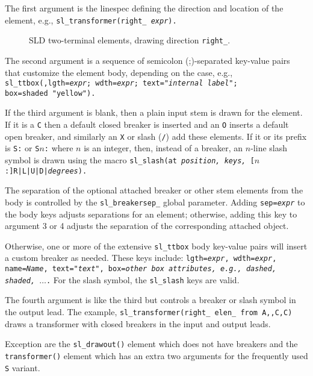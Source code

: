 The first argument is the linespec defining the direction and location
of the element, e.g.,
{\tt sl\_transformer(right\_ {\sl expr}).}
\begin{figure}[H]
   \SLDTwoTerms
   \caption{SLD two-terminal elements, drawing direction {\tt right\_}.}
   \label{SLDTwoTerms}
   \end{figure}

The second argument is a sequence of semicolon (;)-separated key-value
pairs that customize the element body, depending on the case, e.g.,
{\tt sl\_ttbox(,lgth={\sl expr}; wdth={\sl expr};
 text="{\sl internal label}"; box=shaded~"yellow").}

If the third argument is blank, then a plain input stem is drawn for the
element.
If it is a {\tt C} then a default closed
breaker is inserted and an {\tt O} inserts a default open breaker,
and similarly an {\tt X} or slash ({\tt/}) add these elements.
If it or its prefix is {\tt S:} or {\tt S$n$:} where $n$ is an integer,
then, instead of a breaker,
an $n$-line slash symbol is drawn using the macro
{\tt sl\_slash(at {\sl position, keys,} [$n$:]R|L|U|D|{\sl degrees}).}

The separation of the optional attached breaker or other stem elements from
the body is controlled by the {\tt sl\_breakersep\_} global
parameter.  Adding {\tt sep={\sl expr}} to the body keys
adjusts separations for an element; otherwise, adding
this key to argument 3 or 4 adjusts the separation of
the corresponding attached object.

Otherwise, one or more of the extensive {\tt sl\_ttbox} body
key-value pairs will insert a custom breaker as needed.  These keys include:
{\tt lgth={\sl expr},
wdth={\sl expr},
name={\sl Name},
text="{\sl text}",
box={\sl other box attributes, e.g., {\tt dashed, shaded,} $\ldots$}.}
For the slash symbol, the {\tt sl\_slash} keys are valid. 

The fourth argument is like the third but controls a breaker or slash
symbol in the output
lead. The example, {\tt sl\_transformer(right\_ elen\_ from A,{},C,C)}
draws a transformer with closed breakers in the input and output leads.

Exception are the {\tt sl\_drawout()} element which does not have breakers
and the {\tt transformer()} element which has an extra two arguments for
the frequently used {\tt S} variant.

